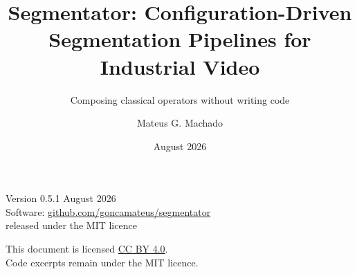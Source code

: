 \documentclass[11pt, a4paper, DIV=11, parskip=half-]{scrartcl}
\title{Segmentator: Configuration-Driven Segmentation Pipelines for Industrial Video}
\subtitle{Composing \NumStages{} classical operators without writing code}
\author{Mateus G. Machado}
\date{August 2026}
\begin{document}
\begin{titlepage}
\sffamily
\noindent{\color{accent}\rule{\textwidth}{2.5pt}}\par
\vspace{2cm}

\par
\vspace{6mm}
\par
\vspace{5mm}
\par

\vspace{2.4cm}
\par
\vspace{2mm}
\par

\vfill
\noindent{\color{rule}\rule{\textwidth}{0.6pt}}\par
\vspace{3mm}
\noindent\begin{minipage}[t]{0.48\textwidth}
  \small\color{muted}
  Version 0.5.1 \quad August 2026\\
  Software: \href{https://github.com/goncamateus/segmentator}{github.com/goncamateus/segmentator}\\
  released under the MIT licence
\end{minipage}\hfill
\begin{minipage}[t]{0.48\textwidth}
  \small\color{muted}
  This document is licensed \href{https://creativecommons.org/licenses/by/4.0/}{CC BY 4.0}.\\
  Code excerpts remain under the MIT licence.
\end{minipage}
\end{titlepage}

\setcounter{tocdepth}{1}
\tableofcontents
\clearpage
\end{document}
